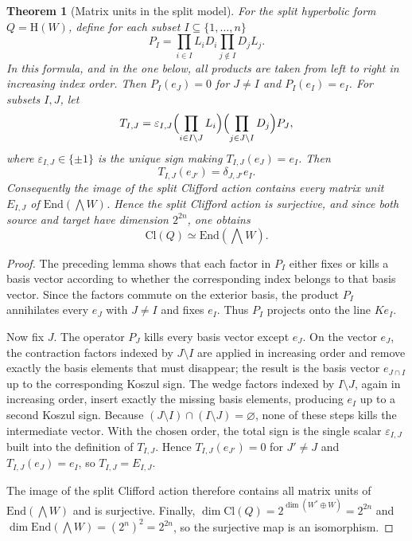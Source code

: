 \documentclass{birkjour}
\theoremstyle{plain}
\newtheorem{theorem}{Theorem}[section]
\theoremstyle{definition}
\theoremstyle{remark}
\numberwithin{equation}{section}
\newcommand{\Cl}{\mathrm{Cl}}
\newcommand{\End}{\mathrm{End}}
\newcommand{\Hyp}{\mathrm{H}}
\begin{document}
\begin{theorem}[Matrix units in the split model]
\label{thm:matrix-units-split}
For the split hyperbolic form $Q=\Hyp(W)$, define for each subset
$I\subseteq \{1,\dots,n\}$
\[
  P_I=\prod_{i\in I} L_iD_i \prod_{j\notin I} D_jL_j .
\]
In this formula, and in the one below, all products are taken from left to
right in increasing index order. Then $P_I(e_J)=0$ for $J\neq I$ and
$P_I(e_I)=e_I$. For subsets $I,J$, let
\[
  T_{I,J}=
    \varepsilon_{I,J}
    \Bigl(\prod_{i\in I\setminus J} L_i\Bigr)
    \Bigl(\prod_{j\in J\setminus I} D_j\Bigr)
    P_J,
\]
where $\varepsilon_{I,J}\in\{\pm 1\}$ is the unique sign making
$T_{I,J}(e_J)=e_I$. Then
\[
  T_{I,J}(e_{J'})=\delta_{J,J'} e_I.
\]
Consequently the image of the split Clifford action contains every matrix unit
$E_{I,J}$ of $\End(\bigwedge W)$. Hence the split Clifford action is
surjective, and since both source and target have dimension $2^{2n}$, one obtains
\[
  \Cl(Q)\simeq \End(\bigwedge W).
\]
\end{theorem}

\begin{proof}
The preceding lemma shows that each factor in $P_I$ either fixes or kills a
basis vector according to whether the corresponding index belongs to that basis
vector. Since the factors commute on the exterior basis, the product $P_I$
annihilates every $e_J$ with $J\neq I$ and fixes $e_I$. Thus $P_I$ projects
onto the line $Ke_I$.

Now fix $J$. The operator $P_J$ kills every basis vector except $e_J$. On the
vector $e_J$, the contraction factors indexed by $J\setminus I$ are applied in
increasing order and remove exactly the basis elements that must disappear; the
result is the basis vector $e_{J\cap I}$ up to the corresponding Koszul sign.
The wedge factors indexed by $I\setminus J$, again in increasing order, insert
exactly the missing basis elements, producing $e_I$ up to a second Koszul sign.
Because $(J\setminus I)\cap(I\setminus J)=\varnothing$, none of these steps
kills the intermediate vector. With the chosen order, the total sign is the
single scalar $\varepsilon_{I,J}$ built into the definition of $T_{I,J}$.
Hence $T_{I,J}(e_{J'})=0$ for $J'\neq J$ and $T_{I,J}(e_J)=e_I$, so
$T_{I,J}=E_{I,J}$.

The image of the split Clifford action therefore contains all matrix units of
$\End(\bigwedge W)$ and is surjective. Finally,
$\dim \Cl(Q)=2^{\dim(W^*\oplus W)}=2^{2n}$ and
$\dim \End(\bigwedge W)=(2^n)^2=2^{2n}$, so the surjective map is an
isomorphism.
\end{proof}
\end{document}
